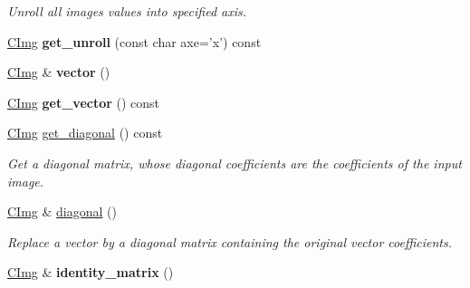 \begin{DoxyCompactItemize}
\begin{DoxyCompactList}\small\item\em Unroll all images values into specified axis. \item\end{DoxyCompactList}\item 
\hypertarget{structcimg__library_1_1_c_img_ae212922b61dbb76478e74137a6317ff5}{
\hyperlink{structcimg__library_1_1_c_img}{CImg} {\bfseries get\_\-unroll} (const char axe='x') const }
\label{structcimg__library_1_1_c_img_ae212922b61dbb76478e74137a6317ff5}

\item 
\hypertarget{structcimg__library_1_1_c_img_af3e87195486eb3a3950c6022be3d6cc5}{
\hyperlink{structcimg__library_1_1_c_img}{CImg} \& {\bfseries vector} ()}
\label{structcimg__library_1_1_c_img_af3e87195486eb3a3950c6022be3d6cc5}

\item 
\hypertarget{structcimg__library_1_1_c_img_a40c36a5a4aa50670018120bf265e1f14}{
\hyperlink{structcimg__library_1_1_c_img}{CImg} {\bfseries get\_\-vector} () const }
\label{structcimg__library_1_1_c_img_a40c36a5a4aa50670018120bf265e1f14}

\item 
\hypertarget{structcimg__library_1_1_c_img_a8437cf30de955154744546a1d8500837}{
\hyperlink{structcimg__library_1_1_c_img}{CImg} \hyperlink{structcimg__library_1_1_c_img_a8437cf30de955154744546a1d8500837}{get\_\-diagonal} () const }
\label{structcimg__library_1_1_c_img_a8437cf30de955154744546a1d8500837}

\begin{DoxyCompactList}\small\item\em Get a diagonal matrix, whose diagonal coefficients are the coefficients of the input image. \item\end{DoxyCompactList}\item 
\hypertarget{structcimg__library_1_1_c_img_a40b6808b8cefada797a46a1309a25664}{
\hyperlink{structcimg__library_1_1_c_img}{CImg} \& \hyperlink{structcimg__library_1_1_c_img_a40b6808b8cefada797a46a1309a25664}{diagonal} ()}
\label{structcimg__library_1_1_c_img_a40b6808b8cefada797a46a1309a25664}

\begin{DoxyCompactList}\small\item\em Replace a vector by a diagonal matrix containing the original vector coefficients. \item\end{DoxyCompactList}\item 
\hypertarget{structcimg__library_1_1_c_img_aae3985708b33a3122eeb22cd7c7900cf}{
\hyperlink{structcimg__library_1_1_c_img}{CImg} \& {\bfseries identity\_\-matrix} ()}
\label{structcimg__library_1_1_c_img_aae3985708b33a3122eeb22cd7c7900cf}


\end{DoxyCompactItemize}
